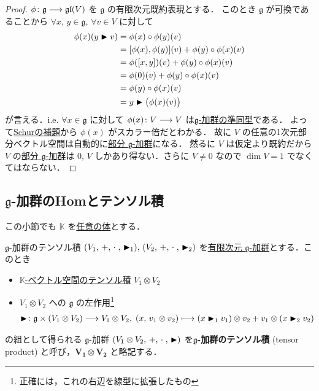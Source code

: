 \documentclass[rep_main]{subfiles}
\begin{document}
\begin{proof}
	$\phi \colon \mathfrak{g} \longrightarrow \mathfrak{gl} (V)$ を $\mathfrak{g}$ の有限次元既約表現とする．
	このとき $\mathfrak{g}$ が可換であることから $\forall x,\, y \in \mathfrak{g},\, \forall v \in V$ に対して
	\begin{align}
		\phi(x)(y \btr v) 
		&= \phi(x) \circ \phi(y) (v) \\
		&= \comm{\phi(x)}{\phi(y)}(v) + \phi(y) \circ \phi(x)(v) \\
		&= \phi(\comm{x}{y})(v) + \phi(y) \circ \phi(x)(v) \\
		&= \phi(0)(v) + \phi(y) \circ \phi(x)(v) \\
		&= \phi(y) \circ \phi(x)(v) \\
		&= y \btr \bigl( \phi(x)(v) \bigr)
	\end{align}
	が言える．i.e. $\forall x \in \mathfrak{g}$ に対して $\phi(x) \colon V \longrightarrow V$ は\hyperref[def:g-module-hom]{$\mathfrak{g}$-加群の準同型}である．
	よって\hyperref[col:Schur-closed]{Schurの補題}から $\phi(x)$ がスカラー倍だとわかる．
	故に $V$ の任意の1次元部分ベクトル空間は自動的に\hyperref[def:sub-g-module]{部分 $\mathfrak{g}$-加群}になる．
	然るに $V$ は仮定より既約だから $V$ の\hyperref[def:sub-g-module]{部分 $\mathfrak{g}$-加群}は $0,\, V$ しかあり得ない．さらに $V \neq 0$ なので $\dim V = 1$ でなくてはならない．
\end{proof}

\subsection{$\mathfrak{g}$-加群のHomとテンソル積}

この小節でも $\mathbb{K}$ を\underline{任意の体}とする．

\begin{mydef}[label=def:gmod-tensor]{$\mathfrak{g}$-加群のテンソル積}
	$(V_1,\, +,\, \cdot\;,\, \blacktriangleright_1) ,\, (V_2,\, +,\, \cdot\;,\, \blacktriangleright_2)$ を\underline{有限次元}\hyperref[ax:g-module]{ $\mathfrak{g}$-加群}とする．このとき
	\begin{itemize}
		\item \hyperref[def:univ-vec-tensor]{$\mathbb{K}$-ベクトル空間のテンソル積} $V_1 \otimes V_2$
		\item $V_1 \otimes V_2$ への $\mathfrak{g}$ の左作用\footnote{正確には，これの右辺を線型に拡張したもの}
		\begin{align}
			\blacktriangleright \colon \mathfrak{g} \times (V_1 \otimes V_2) \longrightarrow V_1 \otimes V_2,\; (x,\, v_1 \otimes v_2) \longmapsto (x \blacktriangleright_1 v_1) \otimes v_2 + v_1 \otimes (x \blacktriangleright_2 v_2)
		\end{align}
	\end{itemize}
	の組として得られる $\mathfrak{g}$-加群 $(V_1 \otimes V_2,\, +,\, \cdot\;,\, \blacktriangleright)$ を\textbf{$\bm{\mathfrak{g}}$-加群のテンソル積} (tensor product) と呼び，$\bm{V_1 \otimes V_2}$ と略記する．
\end{mydef}
\end{document}
